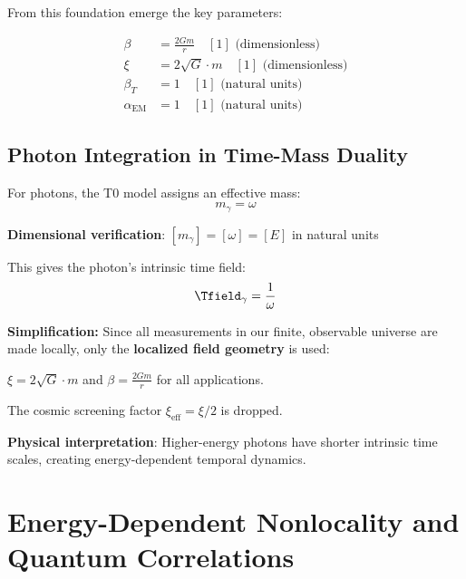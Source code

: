 	From this foundation emerge the key parameters:
	
	\begin{tcolorbox}[colback=blue!5!white,colframe=blue!75!black,title=T0 Model Parameters for Photon Analysis]
		\begin{align}
			\beta &= \frac{2Gm}{r} \quad [1] \text{ (dimensionless)} \\
			\xi &= 2\sqrt{G} \cdot m \quad [1] \text{ (dimensionless)} \\
			\beta_T &= 1 \quad [1] \text{ (natural units)} \\
			\alpha_{\text{EM}} &= 1 \quad [1] \text{ (natural units)}
		\end{align}
	\end{tcolorbox}
	
	\subsection{Photon Integration in Time-Mass Duality}
	
	For photons, the T0 model assigns an effective mass:
	\begin{equation}
		m_\gamma = \omega
		\label{eq:photon_effective_mass}
	\end{equation}
	
	\textbf{Dimensional verification}: $[m_\gamma] = [\omega] = [E]$ in natural units \checkmark
	
	This gives the photon's intrinsic time field:
	\begin{equation}
		\Tfield_\gamma = \frac{1}{\omega}
		\label{eq:photon_time_field}
	\end{equation}
\begin{tcolorbox}[colback=yellow!5!white,colframe=orange!75!black,title=Practical Simplification]
	\textbf{Simplification:} Since all measurements in our finite, observable universe are made locally, only the \textbf{localized field geometry} is used:
	
	$\xi = 2\sqrt{G} \cdot m$ and $\beta = \frac{2Gm}{r}$ for all applications.
	
	The cosmic screening factor $\xi_{\text{eff}} = \xi/2$ is dropped.
\end{tcolorbox}	
	\textbf{Physical interpretation}: Higher-energy photons have shorter intrinsic time scales, creating energy-dependent temporal dynamics.
	
	\section{Energy-Dependent Nonlocality and Quantum Correlations}
	
